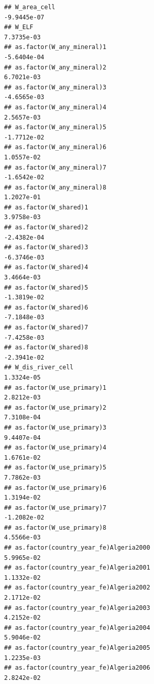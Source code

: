 \documentclass[
  a4paper,
]{article}
\begin{document}
\begin{verbatim}
## W_area_cell                                                    -9.9445e-07
## W_ELF                                                           7.3735e-03
## as.factor(W_any_mineral)1                                      -5.6404e-04
## as.factor(W_any_mineral)2                                       6.7021e-03
## as.factor(W_any_mineral)3                                      -4.6565e-03
## as.factor(W_any_mineral)4                                       2.5657e-03
## as.factor(W_any_mineral)5                                      -1.7712e-02
## as.factor(W_any_mineral)6                                       1.0557e-02
## as.factor(W_any_mineral)7                                      -1.6542e-02
## as.factor(W_any_mineral)8                                       1.2027e-01
## as.factor(W_shared)1                                            3.9758e-03
## as.factor(W_shared)2                                           -2.4382e-04
## as.factor(W_shared)3                                           -6.3746e-03
## as.factor(W_shared)4                                            3.4664e-03
## as.factor(W_shared)5                                           -1.3819e-02
## as.factor(W_shared)6                                           -7.1848e-03
## as.factor(W_shared)7                                           -7.4258e-03
## as.factor(W_shared)8                                           -2.3941e-02
## W_dis_river_cell                                                1.3324e-05
## as.factor(W_use_primary)1                                       2.8212e-03
## as.factor(W_use_primary)2                                       7.3108e-04
## as.factor(W_use_primary)3                                       9.4407e-04
## as.factor(W_use_primary)4                                       1.6761e-02
## as.factor(W_use_primary)5                                       7.7862e-03
## as.factor(W_use_primary)6                                       1.3194e-02
## as.factor(W_use_primary)7                                      -1.2082e-02
## as.factor(W_use_primary)8                                       4.5566e-03
## as.factor(country_year_fe)Algeria2000                           5.9965e-02
## as.factor(country_year_fe)Algeria2001                           1.1332e-02
## as.factor(country_year_fe)Algeria2002                           2.1712e-02
## as.factor(country_year_fe)Algeria2003                           4.2152e-02
## as.factor(country_year_fe)Algeria2004                           5.9046e-02
## as.factor(country_year_fe)Algeria2005                           1.2235e-03
## as.factor(country_year_fe)Algeria2006                           2.8242e-02

\end{verbatim}
\end{document}
